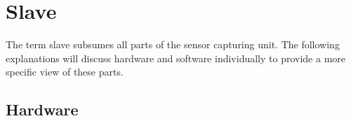 
\chapter{Slave}

The term slave subsumes all parts of the sensor capturing unit.
The following explanations will discuss hardware and software individually to provide a more specific view of these parts.

\section{Hardware}

\begin{figure}[ht]
    \centering
    \qquad
    \qquad
    \label{view:slave1}
\end{figure}

